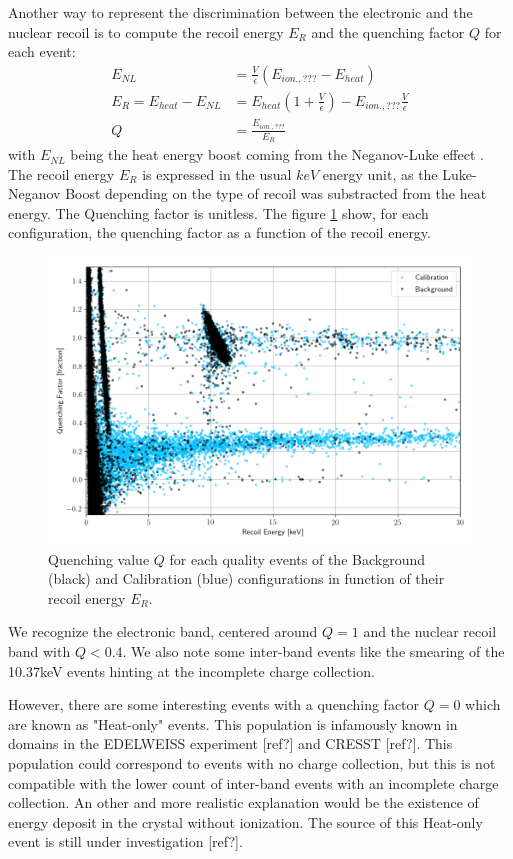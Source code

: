 Another way to represent the discrimination between the electronic and the nuclear recoil is to compute the recoil energy $E_R$ and the quenching factor $Q$ for each event:
\begin{align}
\label{eq:quenching-from-ecei}
	E_{NL} &= \frac{V}{\epsilon} ( E_{ion., ???} - E_{heat} )
	\\
	E_R = E_{heat} - E_{NL} &= E_{heat} \left( 1 + \frac{V}{\epsilon} \right) - E_{ion., ???} \frac{V}{\epsilon}
	\\
	Q &= \frac{E_{ion., ???}}{E_R}
\end{align}
with $E_{NL}$ being the heat energy boost coming from the Neganov-Luke effect \cite{luke-neganov-effect}.
The recoil energy $E_R$ is expressed in the usual $keV$ energy unit, as the Luke-Neganov Boost depending on the type of recoil was substracted from the heat energy. The Quenching factor is unitless.
The figure \ref{fig:quenching_plot} show, for each configuration, the quenching factor as a function of the recoil energy.

\begin{figure}
\centering
\includegraphics[width=\linewidth,]{Figures/Neutron/quenching_plot.png}
\caption{Quenching value $Q$ for each quality events of the Background (black) and Calibration (blue) configurations in function of their recoil energy $E_R$.}
\label{fig:quenching_plot}
\end{figure}

We recognize the electronic band, centered around $Q=1$ and the nuclear recoil band with $Q<0.4$. We also note some inter-band events like the smearing of the 10.37keV events hinting at the incomplete charge collection.

However, there are some interesting events with a quenching factor $Q=0$ which are known as "Heat-only" events. This population is infamously known in domains in the EDELWEISS experiment [ref?] and CRESST [ref?]. This population could correspond to events with no charge collection, but this is not compatible with the lower count of inter-band events with an incomplete charge collection. An other and more realistic explanation would be the existence of energy deposit in the crystal without ionization. The source of this Heat-only event is still under investigation [ref?].

